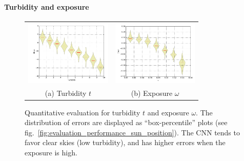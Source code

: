 \paragraph{Turbidity and exposure}

\begin{figure}[!th]
    \centering
    \footnotesize
    \setlength{\tabcolsep}{1pt}
    \begin{tabular}{cc}
    \includegraphics[height=3.1cm]{figures/evaluation_performances/dist-turdibity.pdf} &
    \includegraphics[height=3.1cm]{./figures/evaluation_performances/dist-omega.pdf} \\
    (a) Turbidity $t$ &
    (b) Exposure $\omega$ 
    \end{tabular}
    \vspace{.25em}
    \caption{Quantitative evaluation for turbidity $t$ and exposure $\omega$. The distribution of errors are displayed as ``box-percentile'' plots (see fig.~\ref{fig:evaluation_performance_sun_position}). The CNN tends to favor clear skies (low turbidity), and has higher errors when the exposure is high.}
    \label{fig:evaluation_sky_parameters}
\end{figure}

